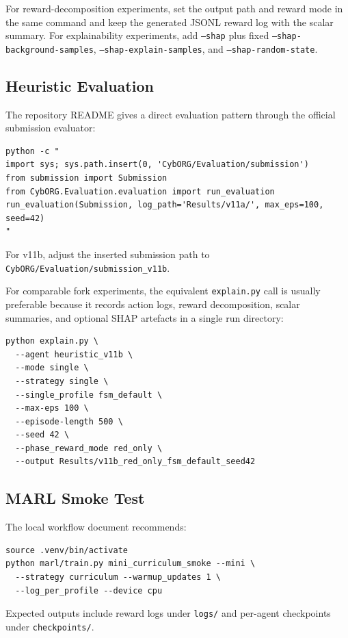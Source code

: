 For reward-decomposition experiments, set the output path and reward mode in the
same command and keep the generated JSONL reward log with the scalar summary.
For explainability experiments, add \texttt{--shap} plus fixed
\texttt{--shap-background-samples}, \texttt{--shap-explain-samples}, and
\texttt{--shap-random-state}.

\subsection{Heuristic Evaluation}

The repository README gives a direct evaluation pattern through the official
submission evaluator:

\begin{lstlisting}
python -c "
import sys; sys.path.insert(0, 'CybORG/Evaluation/submission')
from submission import Submission
from CybORG.Evaluation.evaluation import run_evaluation
run_evaluation(Submission, log_path='Results/v11a/', max_eps=100, seed=42)
"
\end{lstlisting}

For v11b, adjust the inserted submission path to \texttt{CybORG/Evaluation/submission\_v11b}.

For comparable fork experiments, the equivalent \texttt{explain.py} call is
usually preferable because it records action logs, reward decomposition, scalar
summaries, and optional SHAP artefacts in a single run directory:

\begin{lstlisting}
python explain.py \
  --agent heuristic_v11b \
  --mode single \
  --strategy single \
  --single_profile fsm_default \
  --max-eps 100 \
  --episode-length 500 \
  --seed 42 \
  --phase_reward_mode red_only \
  --output Results/v11b_red_only_fsm_default_seed42
\end{lstlisting}

\subsection{MARL Smoke Test}

The local workflow document recommends:

\begin{lstlisting}
source .venv/bin/activate
python marl/train.py mini_curriculum_smoke --mini \
  --strategy curriculum --warmup_updates 1 \
  --log_per_profile --device cpu
\end{lstlisting}

Expected outputs include reward logs under \texttt{logs/} and per-agent checkpoints under \texttt{checkpoints/}.

